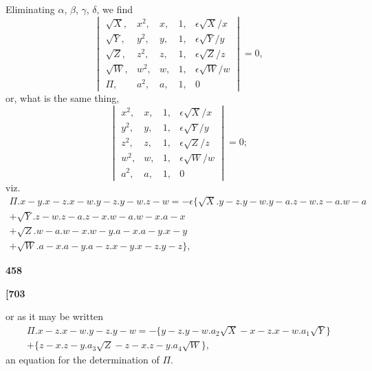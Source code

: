 \documentclass[11pt,a4paper]{book}
\begin{document}
Eliminating $\alpha$, $\beta$, $\gamma$, $\delta$, we find
\[
\begin{vmatrix}
\sqrt{X}, & x^2, & x, & 1, & \epsilon\sqrt{X}/x \\
\sqrt{Y}, & y^2, & y, & 1, & \epsilon\sqrt{Y}/y \\
\sqrt{Z}, & z^2, & z, & 1, & \epsilon\sqrt{Z}/z \\
\sqrt{W}, & w^2, & w, & 1, & \epsilon\sqrt{W}/w \\
\Pi, & a^2, & a, & 1, & 0
\end{vmatrix} = 0,
\]
or, what is the same thing,
\[
\begin{vmatrix}
x^2, & x, & 1, & \epsilon\sqrt{X}/x \\
y^2, & y, & 1, & \epsilon\sqrt{Y}/y \\
z^2, & z, & 1, & \epsilon\sqrt{Z}/z \\
w^2, & w, & 1, & \epsilon\sqrt{W}/w \\
a^2, & a, & 1, & 0
\end{vmatrix} = 0;
\]
viz.
\begin{multline*}
\Pi . x - y . x - z . x - w . y - z . y - w . z - w = -\epsilon \{\sqrt{X}.y - z.y - w.y - a.z - w.z - a.w - a \\
+ \sqrt{Y}.z - w.z - a.z - x.w - a.w - x.a - x \\
+ \sqrt{Z}.w - a.w - x.w - y.a - x.a - y.x - y \\
+ \sqrt{W}.a - x.a - y.a - z.x - y.x - z.y - z\},
\end{multline*}

\vspace{1em}

\begin{center}
\textbf{458}
\end{center}

\vspace{0.5em}

\noindent\textbf{[703}

\vspace{0.5em}

or as it may be written
\begin{multline*}
\Pi . x - z . x - w . y - z . y - w = -\{y - z . y - w . a_2 \sqrt{X} - x - z . x - w . a_1 \sqrt{Y}\} \\
+ \{z - x . z - y . a_3 \sqrt{Z} - z - x . z - y . a_4 \sqrt{W}\},
\end{multline*}
an equation for the determination of $\Pi$.
\end{document}
